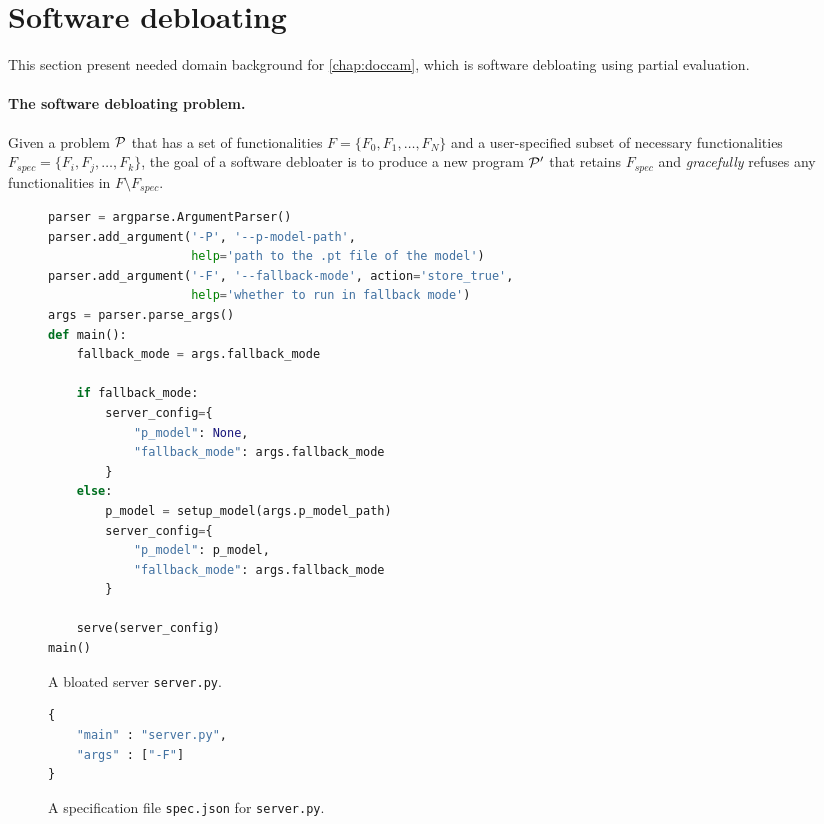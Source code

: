 \section{Software debloating}
This section present needed domain background for \cref{chap:doccam}, which is software debloating using partial evaluation.
\paragraph{The software debloating problem.} Given a problem $\mathcal{P}$ that has a set of functionalities $F = \{F_0, F_1, \dots, F_N\}$ and a user-specified subset of necessary functionalities $F_{spec} = \{F_i, F_j, \dots, F_k\}$, the goal of a software debloater is to produce a new program $\mathcal{P}'$ that retains $F_{spec}$ and \emph{gracefully} refuses any functionalities in $F \setminus F_{spec}$.
\begin{figure}[t]
\begin{lstlisting}[language=Python]
parser = argparse.ArgumentParser()
parser.add_argument('-P', '--p-model-path', 
                    help='path to the .pt file of the model')
parser.add_argument('-F', '--fallback-mode', action='store_true', 
                    help='whether to run in fallback mode')
args = parser.parse_args()
def main():
    fallback_mode = args.fallback_mode
    
    if fallback_mode:
        server_config={
            "p_model": None,
            "fallback_mode": args.fallback_mode
        }
    else:
        p_model = setup_model(args.p_model_path)
        server_config={
            "p_model": p_model,
            "fallback_mode": args.fallback_mode
        }
        
    serve(server_config)
main()
\end{lstlisting}
    \caption{A bloated server \texttt{server.py}.}
    \label{fig:bloated_exp}
\end{figure}

\begin{figure}
    \begin{lstlisting}[language=Python]
{
    "main" : "server.py",
    "args" : ["-F"]
}
    \end{lstlisting}
    \caption{A specification file \texttt{spec.json} for \texttt{server.py}.}
    \label{fig:server_spec}
\end{figure}

